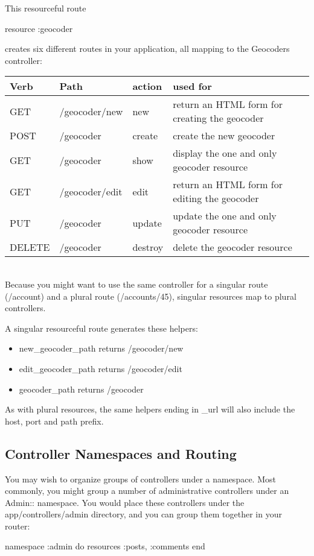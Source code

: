 \documentclass[10pt]{book}
\newenvironment{code}{%
  \scriptsize
    \verbatim
}{%
    \endverbatim
    \newline
}
\begin{document}
This resourceful route
\begin{code}
resource :geocoder
\end{code}

creates six different routes in your application, all mapping to the Geocoders controller:
\\

\noindent
\begin{tabular}{p{}|p{}|p{}|p{}}
\hline
\textbf{Verb } & \textbf{Path} & \textbf{action } & \textbf{used for} \\ 
\hline
GET & /geocoder/new   & new       & return an HTML form for creating the geocoder  \\ 
POST & /geocoder       & create    & create the new geocoder                        \\ 
GET & /geocoder       & show      & display the one and only geocoder resource     \\ 
GET & /geocoder/edit  & edit      & return an HTML form for editing the geocoder   \\ 
PUT & /geocoder       & update    & update the one and only geocoder resource      \\ 
DELETE & /geocoder       & destroy   & delete the geocoder resource                  
\end{tabular}
\\


Because you might want to use the same controller for a singular route (/account) and a plural route (/accounts/45), singular resources map to plural controllers.

A singular resourceful route generates these helpers:
\begin{itemize}
	\item new\_geocoder\_path returns /geocoder/new
	\item edit\_geocoder\_path returns /geocoder/edit
	\item geocoder\_path returns /geocoder
\end{itemize}

As with plural resources, the same helpers ending in \_url will also include the host, port and path prefix.

\subsection{ Controller Namespaces and Routing}

You may wish to organize groups of controllers under a namespace.  Most commonly, you might group a number of administrative controllers  under an Admin:: namespace. You would place these controllers under the app/controllers/admin directory, and you can group them together in your router:
\begin{code}
namespace :admin do
  resources :posts, :comments
end
\end{code}
\end{document}
